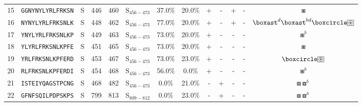 \begin{tabular}{rcccccccccccc}
15 &  \texttt{GGNYNYLYRLFRKSN} &       S &    446 &   460 &  S$_{456-473}$ &                          37.0\% &                           20.0\% &          + &           - &          + &           - &                                                                                           $ \boxast $ \\
16 &  \texttt{NYNYLYRLFRKSNLK} &       S &    448 &   462 &  S$_{456-473}$ &                          77.0\% &                           20.0\% &          + &           - &          + &           - &                 $ \boxast^d \boxast^{bd} \boxcircle \setlength{\fboxsep}{0.5pt} \boxed{\circledast} $ \\
17 &  \texttt{YNYLYRLFRKSNLKP} &       S &    449 &   463 &  S$_{456-473}$ &                          73.0\% &                           20.0\% &          + &           - &          - &           - &                                                                                         $ \boxast^b $ \\
18 &  \texttt{YLYRLFRKSNLKPFE} &       S &    451 &   465 &  S$_{456-473}$ &                          73.0\% &                           20.0\% &          + &           - &          - &           - &                                                                                           $ \boxast $ \\
19 &  \texttt{YRLFRKSNLKPFERD} &       S &    453 &   467 &  S$_{456-473}$ &                          73.0\% &                           23.0\% &          + &           - &          - &           - &                                        $ \boxcircle \setlength{\fboxsep}{0.5pt} \boxed{\circledast} $ \\
20 &  \texttt{RLFRKSNLKPFERDI} &       S &    454 &   468 &  S$_{456-473}$ &                          56.0\% &                            0.0\% &          + &           - &          - &           - &                                                                                         $ \boxast^b $ \\
21 &  \texttt{ISTEIYQAGSTPCNG} &       S &    468 &   482 &  S$_{456-473}$ &                           0.0\% &                           21.0\% &          - &           + &          - &           - &                                                                           $ \boxcircle \boxcircle^b $ \\
22 &  \texttt{GFNFSQILPDPSKPS} &       S &    799 &   813 &  S$_{809-812}$ &                           0.0\% &                           23.0\% &          - &           + &          - &           - &                                                                           $ \boxcircle \boxcircle^b $ \\
\bottomrule
\end{tabular}
